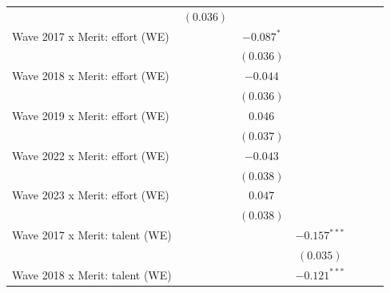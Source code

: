 \documentclass[
  12pt,
]{article}
\begin{document}
\begin{table}
{\begin{center}
{\begin{tabular}{l c c c c c c}
                                                   & $(0.036)$     &               &                &              &               &               \\
Wave 2017 x Merit: effort (WE)                     &               & $-0.087^{*}$  &                &              &               &               \\
                                                   &               & $(0.036)$     &                &              &               &               \\
Wave 2018 x Merit: effort (WE)                     &               & $-0.044$      &                &              &               &               \\
                                                   &               & $(0.036)$     &                &              &               &               \\
Wave 2019 x Merit: effort (WE)                     &               & $0.046$       &                &              &               &               \\
                                                   &               & $(0.037)$     &                &              &               &               \\
Wave 2022 x Merit: effort (WE)                     &               & $-0.043$      &                &              &               &               \\
                                                   &               & $(0.038)$     &                &              &               &               \\
Wave 2023 x Merit: effort (WE)                     &               & $0.047$       &                &              &               &               \\
                                                   &               & $(0.038)$     &                &              &               &               \\
Wave 2017 x Merit: talent (WE)                     &               &               & $-0.157^{***}$ &              &               &               \\
                                                   &               &               & $(0.035)$      &              &               &               \\
Wave 2018 x Merit: talent (WE)                     &               &               & $-0.121^{***}$ &              &               &               \\

\end{tabular}}
\end{center}}
\end{table}
\end{document}
